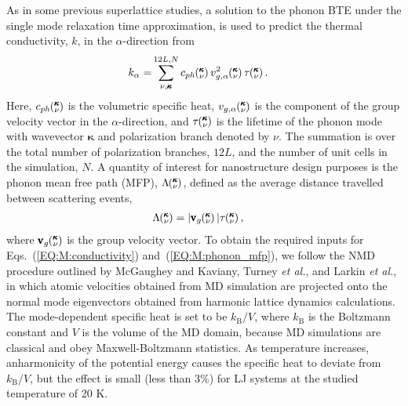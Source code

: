 \documentclass[aps,prb,preprint,preprintnumbers,amsmath,amssymb,floatfix,superscriptaddress]{revtex4}
\newcommand{\kv}{\mspace{-4.0mu}\left(\mspace{-8.0mu}
\begin{smallmatrix}&\pmb{\kappa} \\&\nu\end{smallmatrix}
\mspace{-3.0mu}\right)}
\begin{document}
As in some previous superlattice studies, \cite{Luckyanova16112012,doi:10.1021/nl202186y,savic:073113,PhysRevB.87.140302} a solution to the phonon BTE under the single mode relaxation time approximation,\cite{ziman_electrons_2001} is used to predict the thermal conductivity, $k$, in the $\alpha$-direction from
\begin{equation}\label{EQ:M:conductivity}
\begin{split}
k_{\mathbf{\alpha}}=&\sum_{\nu,\pmb{\kappa}}^{12L,N} c_{ph}\kv
v^{2}_{g,\mathbf{\alpha}}\kv \tau\kv.
\end{split}
\end{equation}
Here, $c_{ph}\kv$ is the volumetric specific heat, $v_{g,\mathbf{\alpha}}\kv$ is the component of the group velocity vector in the $\alpha$-direction, and $\tau\kv$ is the lifetime of the phonon mode with wavevector $\pmb{\kappa}$ and polarization branch denoted by $\nu$. The summation is over the total number of polarization branches, $12L$, and the number of unit cells in the simulation, $N$. A quantity of interest for nanostructure design purposes \cite{PhysRevB.87.035437} is the phonon mean free path (MFP), $\Lambda\kv$, defined as the average distance travelled between scattering events, \cite{ziman_electrons_2001}
\begin{equation}\label{EQ:M:phonon_mfp}
\begin{split}
\Lambda\kv &= |\pmb{\mathrm{v}}_{g}\kv | \tau\kv,
\end{split}
\end{equation}
where $\pmb{\mathrm{v}}_{g}\kv$ is the group velocity vector. To obtain the required inputs for Eqs.~(\ref{EQ:M:conductivity}) and~(\ref{EQ:M:phonon_mfp}), we follow the NMD procedure outlined by McGaughey and Kaviany,\cite{PhysRevB.71.184305} Turney \textit{et al.},\cite {PhysRevB.79.064301} and Larkin \textit{et al.},\cite{jason_inpress} in which atomic velocities obtained from MD simulation are projected onto the normal mode eigenvectors obtained from harmonic lattice dynamics calculations. The mode-dependent specific heat is set to be $k_\mathrm{B}/V$, where  $k_\mathrm{B}$ is the Boltzmann constant and $V$ is the volume of the MD domain, because MD simulations are classical and obey Maxwell-Boltzmann statistics. As temperature increases, anharmonicity of the potential energy causes the specific heat to deviate from $k_\mathrm{B}/V$, but the effect is small (less than 3\%) for LJ systems at the studied temperature of 20 K.\cite{PhysRevB.71.184305} 
\end{document}
